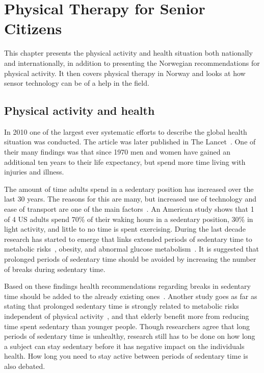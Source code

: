 \chapter{Physical Therapy for Senior Citizens}
This chapter presents the physical activity and health situation both nationally and internationally, in addition to presenting the Norwegian recommendations for physical activity. It then covers physical therapy in Norway and looks at how sensor technology can be of a help in the field.

\section{Physical activity and health}
In 2010 one of the largest ever systematic efforts to describe the global health situation was conducted. The article was later published in The Lancet~\cite{globalBurden}. One of their many findings was that since 1970 men and women have gained an additional ten years to their life expectancy, but spend more time living with injuries and illness. 

The amount of time adults spend in a sedentary position has increased over the last 30 years. The reasons for this are many, but increased use of technology and ease of transport are one of the main factors~\cite{sedentaryBehaviour}. An American study shows that 1 of 4 US adults spend 70\% of their waking hours in a sedentary position, 30\% in light activity, and little to no time is spent exercising. During the last decade research has started to emerge that links extended periods of sedentary time to metabolic risks~\cite{sedentaryTime}, obesity, and abnormal glucose metabolism~\cite{breaksSedentary}. It is suggested that prolonged periods of sedentary time should be avoided by increasing the number of breaks during sedentary time. 

Based on these findings health recommendations regarding breaks in sedentary time should be added to the already existing ones~\cite{breaksSedentary}. Another study goes as far as stating that prolonged sedentary time is strongly related to metabolic risks independent of physical activity~\cite{sedentaryActivity}, and that elderly benefit more from reducing time spent sedentary than younger people. Though researchers agree that long periods of sedentary time is unhealthy, research still has to be done on how long a subject can stay sedentary before it has negative impact on the individuals health. How long you need to stay active between periods of sedentary time is also debated.

